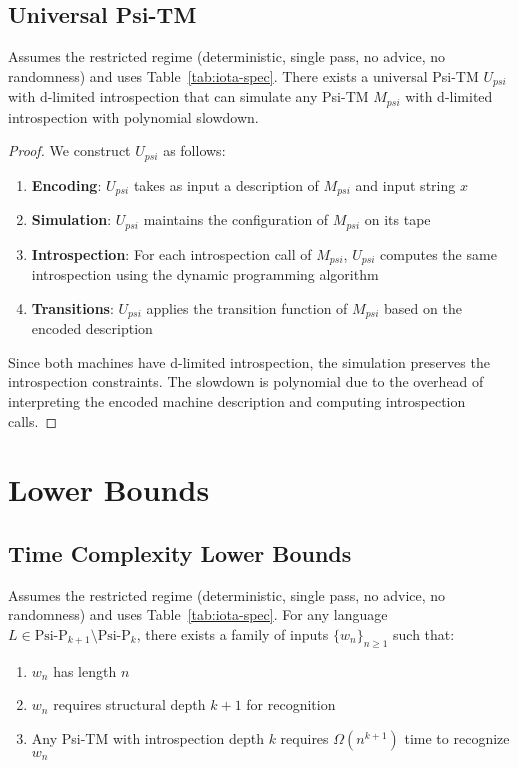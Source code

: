 \subsection{Universal Psi-TM}

\begin{theorem}
Assumes the restricted regime (deterministic, single pass, no advice, no randomness) and uses Table~\ref{tab:iota-spec}.
There exists a universal Psi-TM $U_{psi}$ with d-limited introspection that can simulate any Psi-TM $M_{psi}$ with d-limited introspection with polynomial slowdown.
\end{theorem}

\begin{proof}
We construct $U_{psi}$ as follows:

\begin{enumerate}
\item \textbf{Encoding}: $U_{psi}$ takes as input a description of $M_{psi}$ and input string $x$
\item \textbf{Simulation}: $U_{psi}$ maintains the configuration of $M_{psi}$ on its tape
\item \textbf{Introspection}: For each introspection call of $M_{psi}$, $U_{psi}$ computes the same introspection using the dynamic programming algorithm
\item \textbf{Transitions}: $U_{psi}$ applies the transition function of $M_{psi}$ based on the encoded description
\end{enumerate}

Since both machines have d-limited introspection, the simulation preserves the introspection constraints. The slowdown is polynomial due to the overhead of interpreting the encoded machine description and computing introspection calls.
\end{proof}

\section{Lower Bounds}

\subsection{Time Complexity Lower Bounds}

\begin{theorem}
\label{thm:structural-depth-lower-bound-2}
Assumes the restricted regime (deterministic, single pass, no advice, no randomness) and uses Table~\ref{tab:iota-spec}.
For any language $L \in \text{Psi-P}_{k+1} \setminus \text{Psi-P}_k$, there exists a family of inputs $\{w_n\}_{n \geq 1}$ such that:
\begin{enumerate}
\item $w_n$ has length $n$
\item $w_n$ requires structural depth $k+1$ for recognition
\item Any Psi-TM with introspection depth $k$ requires $\Omega(n^{k+1})$ time to recognize $w_n$
\end{enumerate}
\end{theorem}

